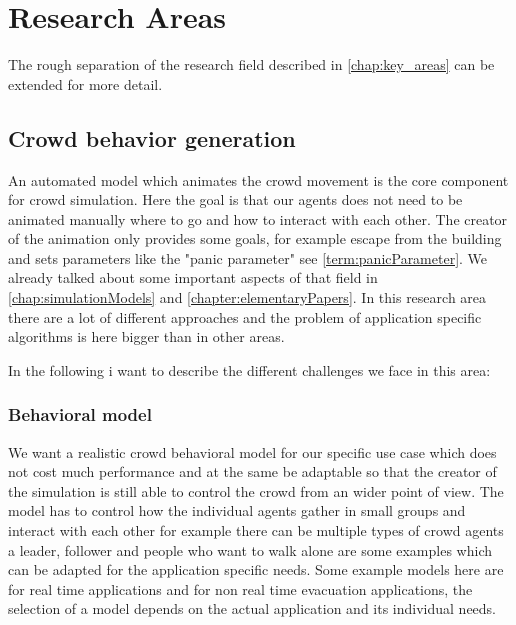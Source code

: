 \documentclass[sigconf]{acmart}
\begin{document}
\section{Research Areas}

The rough separation of the research field described in \ref{chap:key_areas} can be extended for more detail. \cite{thalmann_crowd_2013}

\subsection{Crowd behavior generation}

An automated model which animates the crowd movement is the core component for crowd simulation. Here the goal is that our agents does not need to be animated manually where to go and how to interact with each other. The creator of the animation only provides some goals, for example escape from the building and sets parameters like the "panic parameter" see \ref{term:panicParameter}. We already talked about some important aspects of that field in \ref{chap:simulationModels} and \ref{chapter:elementaryPapers}.  In this research area there are a lot of different approaches and the problem of application specific algorithms is here bigger than in other areas.

In the following i want to describe the different challenges we face in this area:


\subsubsection{Behavioral model}
We want a realistic crowd behavioral model for our specific use case which does not cost much performance and at the same be adaptable so that the creator of the simulation is still able to control the crowd from an wider point of view. The model has to control how the individual agents gather in small groups and interact with each other for example there can be multiple types of crowd agents a leader, follower and people who want to walk alone are some examples which can be adapted for the application specific needs. Some example models here are \cite{musse_hierarchical_2001} for real time applications and \cite{braun_simulating_2005} for non real time evacuation applications, the selection of a model depends on the actual application and its individual needs.
\end{document}
